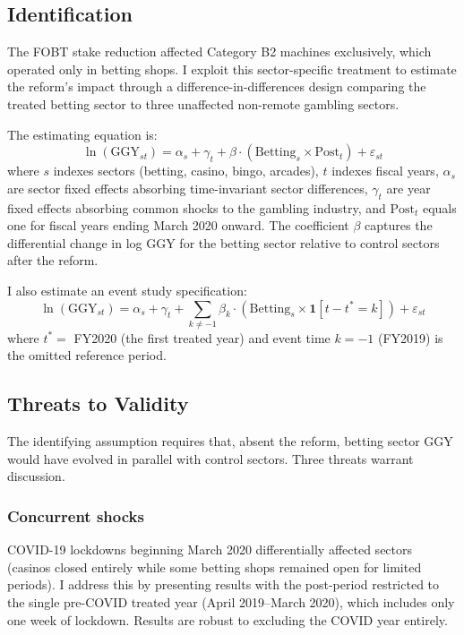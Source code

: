 \documentclass[12pt]{article}
\begin{document}
\subsection{Identification}

The FOBT stake reduction affected Category B2 machines exclusively, which operated only in betting shops. I exploit this sector-specific treatment to estimate the reform's impact through a difference-in-differences design comparing the treated betting sector to three unaffected non-remote gambling sectors.

The estimating equation is:
\begin{equation}
\ln(\text{GGY}_{st}) = \alpha_s + \gamma_t + \beta \cdot (\text{Betting}_s \times \text{Post}_t) + \varepsilon_{st}
\label{eq:did}
\end{equation}
where $s$ indexes sectors (betting, casino, bingo, arcades), $t$ indexes fiscal years, $\alpha_s$ are sector fixed effects absorbing time-invariant sector differences, $\gamma_t$ are year fixed effects absorbing common shocks to the gambling industry, and $\text{Post}_t$ equals one for fiscal years ending March 2020 onward. The coefficient $\beta$ captures the differential change in log GGY for the betting sector relative to control sectors after the reform.

I also estimate an event study specification:
\begin{equation}
\ln(\text{GGY}_{st}) = \alpha_s + \gamma_t + \sum_{k \neq -1} \beta_k \cdot (\text{Betting}_s \times \mathbf{1}[t - t^* = k]) + \varepsilon_{st}
\label{eq:es}
\end{equation}
where $t^* = $ FY2020 (the first treated year) and event time $k = -1$ (FY2019) is the omitted reference period.

\subsection{Threats to Validity}

The identifying assumption requires that, absent the reform, betting sector GGY would have evolved in parallel with control sectors. Three threats warrant discussion.

\subsubsection*{Concurrent shocks} COVID-19 lockdowns beginning March 2020 differentially affected sectors (casinos closed entirely while some betting shops remained open for limited periods). I address this by presenting results with the post-period restricted to the single pre-COVID treated year (April 2019--March 2020), which includes only one week of lockdown. Results are robust to excluding the COVID year entirely.
\end{document}
